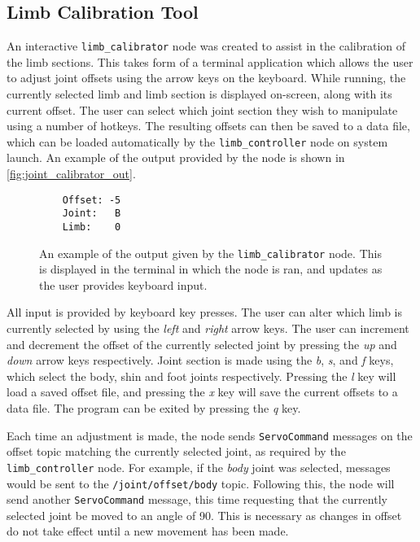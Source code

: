 \subsection{Limb Calibration Tool}

An interactive \texttt{limb\_calibrator} node was created to assist in the calibration of the limb sections. This takes form of a terminal application which allows the user to adjust joint offsets using the arrow keys on the keyboard. While running, the currently selected limb and limb section is displayed on-screen, along with its current offset. The user can select which joint section they wish to manipulate using a number of hotkeys. The resulting offsets can then be saved to a data file, which can be loaded automatically by the \texttt{limb\_controller} node on system launch. An example of the output provided by the node is shown in \autoref{fig:joint_calibrator_out}.

\begin{figure}[!h]
    \centering
	\begin{lstlisting}
	Offset: -5
	Joint:   B
	Limb:    0
	\end{lstlisting}
	\caption{An example of the output given by the \texttt{limb\_calibrator} node. This is displayed in the terminal in which the node is ran, and updates as the user provides keyboard input.}
	\label{fig:joint_calibrator_out}
\end{figure}

All input is provided by keyboard key presses. The user can alter which limb is currently selected  by using the \emph{left} and \emph{right} arrow keys. The user can increment and decrement the offset of the currently selected joint by pressing the \emph{up} and \emph{down} arrow keys respectively. Joint section is made using the \emph{b}, \emph{s}, and \emph{f} keys, which select the body, shin and foot joints respectively. Pressing the \emph{l} key will load a saved offset file, and pressing the \emph{x} key will save the current offsets to a data file. The program can be exited by pressing the \emph{q} key.

Each time an adjustment is made, the node sends \texttt{ServoCommand} messages on the offset topic matching the currently selected joint, as required by the \texttt{limb\_controller} node. For example, if the \emph{body} joint was selected, messages would be sent to the \texttt{/joint/offset/body} topic. Following this, the node will send another \texttt{ServoCommand} message, this time requesting that the currently selected joint be moved to an angle of 90\textdegree{}. This is necessary as changes in offset do not take effect until a new movement has been made.

